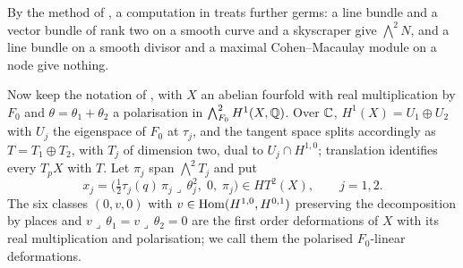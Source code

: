 By the method of , a computation in \cite{BMB26}
treats further germs: a line bundle and a vector bundle of rank two on a
smooth curve and a skyscraper give $\bigwedge^{2}N$, and a line bundle on a
smooth divisor and a maximal Cohen--Macaulay module on a node give nothing.

Now keep the notation of , with $X$ an abelian
fourfold with real multiplication by $F_{0}$ and $\theta=\theta_{1}+\theta_{2}$
a polarisation in $\bigwedge^{2}_{F_{0}}H^{1}(X,\mathbb{Q})$. Over $\mathbb{C}$,
$H^{1}(X)=U_{1}\oplus U_{2}$ with $U_{j}$ the eigenspace of $F_{0}$ at
$\tau_{j}$, and the tangent space splits accordingly as $T=T_{1}\oplus T_{2}$,
with $T_{j}$ of dimension two, dual to $U_{j}\cap H^{1,0}$; translation
identifies every $T_{p}X$ with $T$. Let $\pi_{j}$ span $\bigwedge^{2}T_{j}$
and put
\begin{equation}\label{eq:quarticcompensated}
  x_{j}=\bigl(\tfrac12\tau_{j}(q)\,\pi_{j}\lrcorner\,\theta_{j}^{2},\;0,\;\pi_{j}\bigr)
  \in HT^{2}(X),\qquad j=1,2.
\end{equation}
The six classes $(0,v,0)$ with $v\in\operatorname{Hom}(H^{1,0},H^{0,1})$ preserving the
decomposition by places and $v\lrcorner\,\theta_{1}=v\lrcorner\,\theta_{2}=0$
are the first order deformations of $X$ with its real multiplication and
polarisation; we call them the polarised $F_{0}$-linear deformations.

